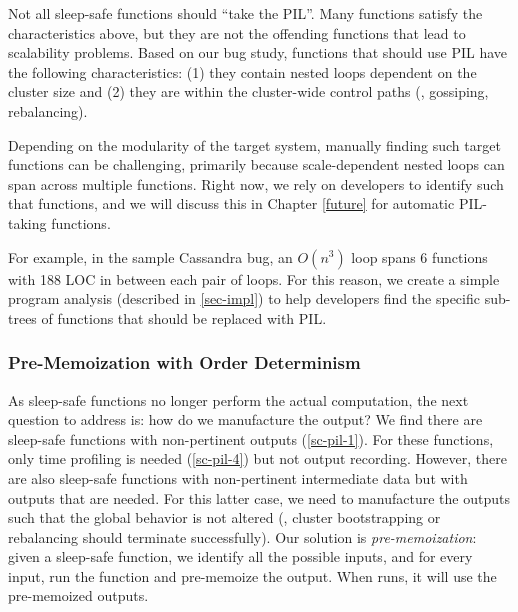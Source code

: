 Not all sleep-safe functions should ``take the PIL''.  Many functions
satisfy the characteristics above, but they are not the offending
functions that lead to scalability problems.  Based on our bug study,
functions that should use PIL have the following  characteristics:
%
(1) they contain nested loops dependent on the cluster
size
%
and (2) they are within the cluster-wide control paths (\eg, gossiping,
rebalancing).


Depending on the modularity of the target system, manually finding such target
functions can be challenging, primarily because scale-dependent nested loops can
span across multiple functions. Right now, we rely on developers to identify
such that functions, and we will discuss this in Chapter \ref{future} for
automatic PIL-taking functions.

For example, in the sample Cassandra bug, an
$O(n^3)$ loop spans 6 functions with 188 LOC in between each pair of loops.  For
this reason, we create a simple program analysis \prx (described in
\sec\ref{sec-impl}) to help developers find the specific sub-trees of functions
that should be replaced with PIL.
\fi


\subsubsection{Pre-Memoization with Order Determinism}
\label{sc-pil-3}


As sleep-safe functions no longer perform the actual computation, the next
question to address is: how do we manufacture the output?  We find there
are sleep-safe functions with non-pertinent outputs
(\sec\ref{sc-pil-1}). For these functions, only time profiling is needed
(\sec\ref{sc-pil-4}) but not output recording.  However, there are also
sleep-safe functions with non-pertinent intermediate data but with outputs
that are needed.
%
For this latter case, we need to manufacture the outputs such that the
global behavior is not altered (\eg, cluster bootstrapping or rebalancing
should terminate successfully).
%
Our solution is {\em pre-memoization}: given a sleep-safe
function, we identify all the possible inputs, and for every input, run
the function and pre-memoize the output.  
When \sck runs, it will use the pre-memoized outputs.


